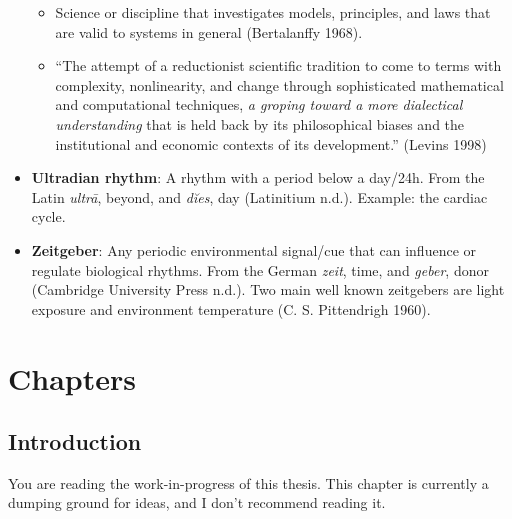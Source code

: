 \documentclass[
  12pt,
  a4paper,
  oneside]{tesesusp}
\providecommand{\tightlist}{%
  \setlength{\itemsep}{0pt}\setlength{\parskip}{0pt}}\usepackage{longtable,booktabs,array}
\begin{document}
\begin{itemize}
  \begin{itemize}
  \tightlist
  \item
    Science or discipline that investigates models, principles, and laws
    that are valid to systems in general (Bertalanffy 1968).
  \item
    ``The attempt of a reductionist scientific tradition to come to
    terms with complexity, nonlinearity, and change through
    sophisticated mathematical and computational techniques, \emph{a
    groping toward a more dialectical understanding} that is held back
    by its philosophical biases and the institutional and economic
    contexts of its development.'' (Levins 1998)
  \end{itemize}
\item
  \textbf{Ultradian rhythm}: A rhythm with a period below a day/24h.
  From the Latin \emph{ultrā}, beyond, and \emph{dĭes}, day (Latinitium
  n.d.). Example: the cardiac cycle.
\item
  \textbf{Zeitgeber}: Any periodic environmental signal/cue that can
  influence or regulate biological rhythms. From the German \emph{zeit},
  time, and \emph{geber}, donor (Cambridge University Press n.d.). Two
  main well known zeitgebers are light exposure and environment
  temperature (C. S. Pittendrigh 1960).
\end{itemize}

\part{Chapters}

\hypertarget{introduction}{%
\chapter{Introduction}\label{introduction}}

\begin{tcolorbox}[enhanced jigsaw, breakable, colback=white, colbacktitle=quarto-callout-important-color!10!white, leftrule=.75mm, left=2mm, toprule=.15mm, opacityback=0, rightrule=.15mm, title=\textcolor{quarto-callout-important-color}{\faExclamation}\hspace{0.5em}{Important}, opacitybacktitle=0.6, bottomtitle=1mm, titlerule=0mm, toptitle=1mm, coltitle=black, colframe=quarto-callout-important-color-frame, bottomrule=.15mm, arc=.35mm]

You are reading the work-in-progress of this thesis. This chapter is
currently a dumping ground for ideas, and I don't recommend reading it.

\end{tcolorbox}
\end{document}
